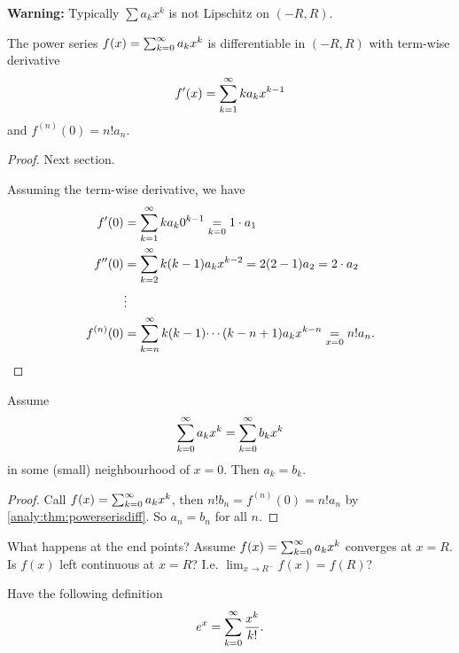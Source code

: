 \documentclass[10pt, a4paper]{article}
\begin{document}
\textbf{Warning:}
Typically $\sum a_kx ^ k$ is not Lipschitz on $(-R, R)$.

\begin{theorem}\label{analy:thm:powerserisdiff}
    The power series $f(x) = \infsumo a_kx ^ k$ is differentiable in $(-R, R)$ with term-wise derivative
    \[
    f'(x) = \infsum ka_kx ^ {k - 1}
    \]
    and $f ^ {(n)}(0) = n!a_n$.

    \begin{proof}
        Next section.
        
        Assuming the term-wise derivative,
        we have
        \begin{align*}
            f'(0) &= \infsum ka_k0 ^ {k - 1} \underset{k = 0}{=} 1 \cdot a_1 \\
            f''(0) &= \infsum[k = 2]k(k - 1)a_kx ^ {k - 2} = 2(2 - 1)a_2 = 2 \cdot a_2 \\
            &\vdots \\
            f ^ {(n)}(0) &= \infsum[k = n]k(k - 1) \dotsi (k - n + 1)a_kx ^ {k - n} \underset{x = 0}{=} n!a_n.
        \end{align*}
    \end{proof}
\end{theorem}

\begin{theorem}
    Assume
    \[
    \infsumo a_kx ^ k = \infsumo b_kx ^ k
    \]
    in some
    (small)
    neighbourhood of $x = 0$.
    Then $a_k = b_k$.

    \begin{proof}
        Call $f(x) = \infsumo a_kx ^ k$,
        then $n!b_n = f ^ {(n)}(0) = n!a_n$ by \autoref{analy:thm:powerserisdiff}.
        So $a_n = b_n$ for all $n$.
    \end{proof}
\end{theorem}

What happens at the end points?
Assume $f(x) = \infsumo a_kx ^ k$ converges at $x = R$.
Is $f(x)$ left continuous at $x = R$?
I.e. $\lim_{x \rightarrow R ^ {-}}f(x) = f(R)$?

\begin{theorem}
    
\end{theorem}

Have the following definition
\[
e ^ x = \infsumo\frac{x ^ k}{k!}.
\]
\end{document}
